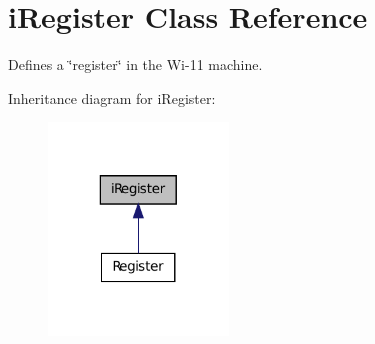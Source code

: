 \hypertarget{classiRegister}{
\section{iRegister Class Reference}
\label{classiRegister}
}


Defines a \char`\"{}register\char`\"{} in the Wi-\/11 machine.  




Inheritance diagram for iRegister:\nopagebreak
\begin{figure}[H]
\begin{center}
\leavevmode
\includegraphics[width=136pt]{classiRegister__inherit__graph}
\end{center}
\end{figure}
